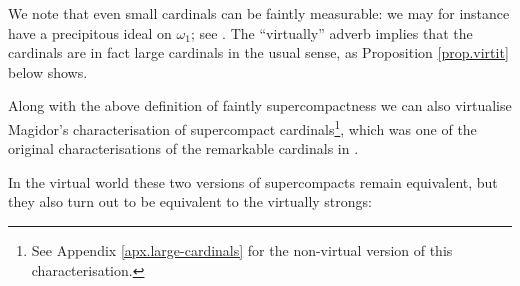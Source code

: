 \documentclass[../../main]{subfiles}
\begin{document}
\qquad We note that even small cardinals can be faintly measurable: we may for instance have a precipitous ideal on $\omega_1$; see \cite[Theorem 22.33]{Jech}. The ``virtually'' adverb implies that the cardinals are in fact large cardinals in the usual sense, as Proposition \ref{prop.virtit} below shows.


Along with the above definition of faintly supercompactness we can also virtualise Magidor's characterisation of supercompact cardinals\footnote{See Appendix \ref{apx.large-cardinals} for the non-virtual version of this characterisation.}, which was one of the original characterisations of the remarkable cardinals in \cite{Schindler}.


In the virtual world these two versions of supercompacts remain equivalent, but they also turn out to be equivalent to the virtually strongs:
\end{document}
